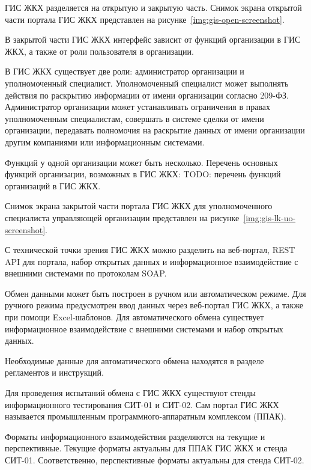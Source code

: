 ГИС ЖКХ разделяется на открытую и закрытую часть.
Снимок экрана открытой части портала ГИС ЖКХ представлен на рисунке~\ref{img:gis-open-screenshot}.

В закрытой части ГИС ЖКХ интерфейс зависит от функций организации в ГИС ЖКХ, а также от роли пользователя в организации.

В ГИС ЖКХ существует две роли: администратор организации и уполномоченный специалист.
Уполномоченный специалист может выполнять действия по раскрытию информации от имени организации согласно 209-ФЗ.
Администратор организации может устанавливать ограничения в правах уполномоченным специалистам, совершать в системе сделки от имени организации, передавать полномочия на раскрытие данных от имени организации другим компаниями или информационным системами.

Функций у одной организации может быть несколько.
Перечень основных функций организации, возможных в ГИС ЖКХ:
TODO: перечень функций организаций в ГИС ЖКХ.

Снимок экрана закрытой части портала ГИС ЖКХ для уполномоченного специалиста управляющей организации представлен на рисунке~\ref{img:gis-lk-uo-screenshot}.



С технической точки зрения ГИС ЖКХ можно разделить на веб-портал, REST API для портала, набор открытых данных и информационное взаимодействие с внешними системами по протоколам SOAP.

Обмен данными может быть построен в ручном или автоматическом режиме.
Для ручного режима предусмотрен ввод данных через веб-портал ГИС ЖКХ, а также при помощи Excel-шаблонов.
Для автоматического обмена существует информационное взаимодействие с внешними системами и набор открытых данных.

Необходимые данные для автоматического обмена находятся в разделе регламентов и инструкций.

Для проведения испытаний обмена с ГИС ЖКХ существуют стенды информационного тестирования СИТ-01 и СИТ-02.
Сам портал ГИС ЖКХ называется промышленным программного-аппаратным комплексом (ППАК).

Форматы информационного взаимодействия разделяются на текущие и перспективные.
Текущие форматы актуальны для ППАК ГИС ЖКХ и стенда СИТ-01.
Соответственно, перспективные форматы актуальны для стенда СИТ-02.

